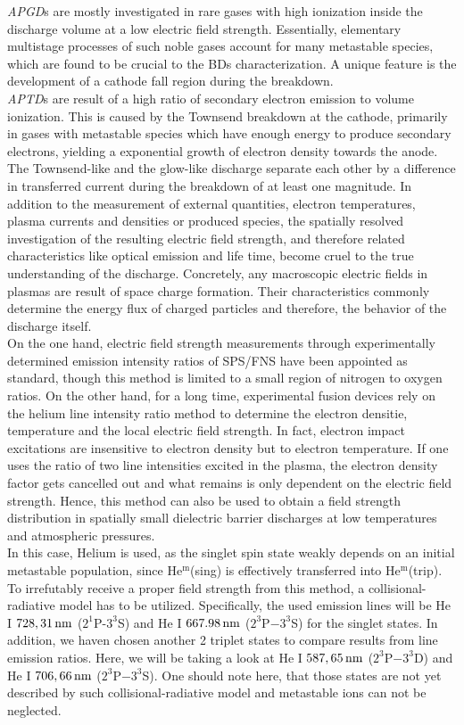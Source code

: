 \documentclass[a4paper,10pt,twoside]{article}
\newcommand{\tilt}[1]{\textit{#1}}
\begin{document}
		\tilt{APGD}s are mostly investigated in rare gases with high ionization inside the discharge volume at a low electric field strength. Essentially, elementary multistage processes of such noble gases account for many metastable species, which are found to be crucial to the BDs characterization. A unique feature is the development of a cathode fall region during the breakdown.\\
		\tilt{APTD}s are result of a high ratio of secondary electron emission to volume ionization. This is caused by the Townsend breakdown at the cathode, primarily in gases with metastable species which have enough energy to produce secondary electrons, yielding a exponential growth of electron density towards the anode.\\
		The Townsend-like and the glow-like discharge separate each other by a difference in transferred current during the breakdown of at least one magnitude. In addition to the measurement of external quantities, electron temperatures, plasma currents and densities or produced species, the spatially resolved investigation of the resulting electric field strength, and therefore related characteristics like optical emission and life time, become cruel to the true understanding of the discharge. Concretely, any macroscopic electric fields in plasmas are result of space charge formation. Their characteristics commonly determine the energy flux of charged particles and therefore, the behavior of the discharge itself. \\
		On the one hand, electric field strength measurements through experimentally determined emission intensity ratios of SPS/FNS have been appointed as standard, though this method is limited to a small region of nitrogen to oxygen ratios. On the other hand, for a long time, experimental fusion devices rely on the helium line intensity ratio method to determine the electron densitie, temperature and the local electric field strength. In fact, electron impact excitations are insensitive to electron density but to electron temperature. If one uses the ratio of two line intensities excited in the plasma, the electron density factor gets cancelled out and what remains is only dependent on the electric field strength. Hence, this method can also be used to obtain a field strength distribution in spatially small dielectric barrier discharges at low temperatures and atmospheric pressures.\\
		In this case, Helium is used, as the singlet spin state weakly depends on an initial metastable population, since He$^{\text{m}}$(sing) is effectively transferred into He$^{\text{m}}$(trip). To irrefutably receive a proper field strength from this method, a collisional-radiative model has to be utilized. Specifically, the used emission lines will be He I $\unit[728,31]{nm}$ ($2^1$P-$3^3$S) and He I $\unit[667.98]{nm}$ ($2^3$P$-3^3$S) for the singlet states. In addition, we haven chosen another 2 triplet states to compare results from line emission ratios. Here, we will be taking a look at He I $\unit[587,65]{nm}$ ($2^3$P$-3^3$D) and He I $\unit[706,66]{nm}$ ($2^3$P$-3^3$S). One should note here, that those states are not yet described by such collisional-radiative model and metastable ions can not be neglected.\\
\end{document}
